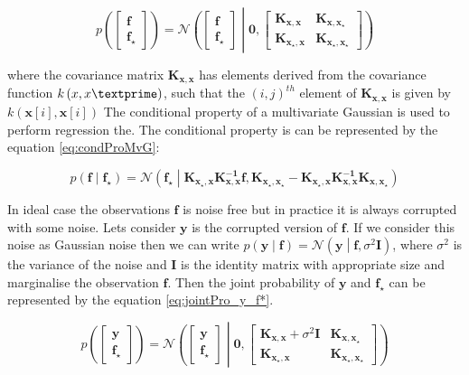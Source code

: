 \begin{equation} \label{eq:jointPro_f_f*}
p \left( \begin{bmatrix} \mathbf{f} \\\mathbf{f_\star} \end{bmatrix} \right) =
\mathcal{N}\left( \begin{bmatrix} \mathbf{f} \\\mathbf{f_\star} \end{bmatrix} \middle|
\mathbf{0}, \begin{bmatrix} \mathbf{K_{x,x}} & \mathbf{K_{x,x_\star}} \\
			    \mathbf{K_{x_\star,x}} & \mathbf{K_{x_\star,x_\star}} \end{bmatrix} \right)
\end{equation}

where the covariance matrix $ \mathbf{K_{x,x}}$ has elements derived from the covariance function 
$ k \left(x,x\textprime \right)$, such that the $ \left(i,j \right)^{th}$ element of $ \mathbf{K_{x,x}}$ is
given by $k \left( \mathbf{x} \left[ i\right],\mathbf{x} \left[ i\right] \right) $ 
The conditional property of a multivariate Gaussian is used to perform regression the. The conditional
property is can be represented by the equation \ref{eq:condProMvG}: 

\begin{equation} \label{eq:condProMvG}
p \left( \mathbf{f} \middle| \mathbf{f_\star} \right) =
\mathcal{N}\left( \mathbf{f_\star} \middle| \mathbf{K_{x_\star,x}}  \mathbf{K^{-1}_{x,x}} \mathbf{f,} \mathbf{K_{x_\star,x_\star}} - 
\mathbf{K_{x_\star,x}} \mathbf{K^{-1}_{x,x}} \mathbf{K_{x,x_\star}}\right)
\end{equation}

In ideal case the observations $\mathbf{f}$ is noise free but in practice it is always corrupted with some noise.
Lets consider $\mathbf{y}$ is the corrupted version of $\mathbf{f}$. If we consider this noise as Gaussian noise
then we can write $p \left( \mathbf{y} \middle| \mathbf{f} \right) = \mathcal{N} \left( \mathbf{y} \middle| \mathbf{f},
\sigma^2 \mathbf{I} \right) $, where $ \sigma^2 $ is the variance of the noise and $\mathbf{I}$ is the identity
matrix with appropriate size and marginalise the observation $\mathbf{f}$. Then the joint probability of 
$\mathbf{y}$ and $\mathbf{f_\star}$ can be represented by the equation \ref{eq:jointPro_y_f*}.

\begin{equation} \label{eq:jointPro_y_f*}
p \left( \begin{bmatrix} \mathbf{y} \\\mathbf{f_\star} \end{bmatrix} \right) =
\mathcal{N}\left( \begin{bmatrix} \mathbf{y} \\\mathbf{f_\star} \end{bmatrix} \middle|
\mathbf{0}, \begin{bmatrix} \mathbf{K_{x,x}}+ \sigma^2\mathbf{I} & \mathbf{K_{x,x_\star}} \\
			    \mathbf{K_{x_\star,x}} & \mathbf{K_{x_\star,x_\star}} \end{bmatrix} \right)
\end{equation}

